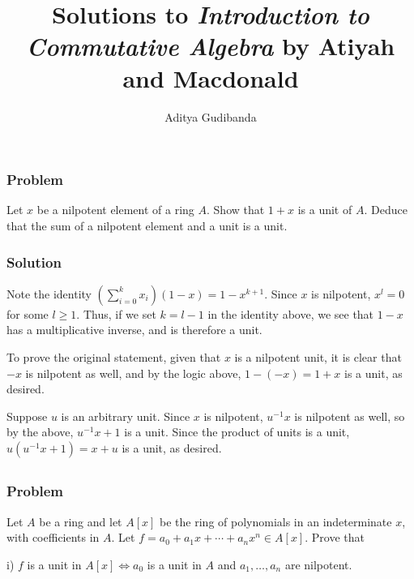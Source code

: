 \documentclass[book,12pt,oneside,openany]{memoir}
\title{Solutions to \emph{Introduction to Commutative Algebra} by Atiyah and Macdonald}
\author{Aditya Gudibanda}
\begin{document}
\maketitle

\chapter{}

\section{}
\subsection{Problem}
Let $x$ be a nilpotent element of a ring $A$. Show that $1 + x$ is a unit of  $A$. Deduce that the sum of a nilpotent element and a unit is a unit.

\subsection{Solution}
Note the identity $\left(\sum_{i = 0}^k x_i \right) (1-x) =  1- x^{k+1}$. Since $x$ is nilpotent,  $x^l = 0$ for some $l \geq 1$. Thus, if we set $k = l-1$ in the identity above, we see that $1-x$ has a multiplicative inverse, and is therefore  a unit. 

To prove the original statement, given that $x$ is a nilpotent unit, it is clear that $-x$ is nilpotent as well, and by the logic above, $1 - (-x) = 1 + x$ is a unit, as desired.

Suppose $u$ is an arbitrary unit. Since $x$ is nilpotent, $u^{-1}x$ is nilpotent as well, so by the above, $u^{-1}x + 1$ is a unit. Since the product of units is a unit, $u(u^{-1}x + 1) = x + u$ is a unit, as desired.

\section{}
\subsection{Problem}
Let $A$ be a ring and let $A[x]$ be the ring of polynomials in an indeterminate $x$, with coefficients in $A$. Let $f = a_0 + a_1x + \cdots + a_n x^n \in A[x]$. Prove that

i) $f$ is a unit in $A[x] \Leftrightarrow a_0$ is a unit in $A$ and $a_1, \ldots, a_n$ are nilpotent. 
\end{document}
